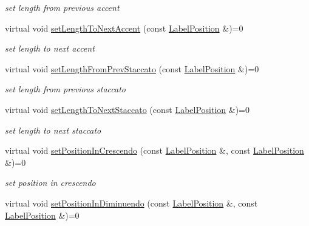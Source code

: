 \begin{DoxyCompactItemize}
\begin{DoxyCompactList}\small\item\em set length from previous accent \end{DoxyCompactList}\item 
\hypertarget{classsinsy_1_1INoteLabel_aeef956ffef5e64d64ed1b6005561755f}{virtual void \hyperlink{classsinsy_1_1INoteLabel_aeef956ffef5e64d64ed1b6005561755f}{set\-Length\-To\-Next\-Accent} (const \hyperlink{classsinsy_1_1LabelPosition}{\-Label\-Position} \&)=0}\label{classsinsy_1_1INoteLabel_aeef956ffef5e64d64ed1b6005561755f}

\begin{DoxyCompactList}\small\item\em set length to next accent \end{DoxyCompactList}\item 
\hypertarget{classsinsy_1_1INoteLabel_a6858fae4cc676d1a54fe6f7b7b7d00c5}{virtual void \hyperlink{classsinsy_1_1INoteLabel_a6858fae4cc676d1a54fe6f7b7b7d00c5}{set\-Length\-From\-Prev\-Staccato} (const \hyperlink{classsinsy_1_1LabelPosition}{\-Label\-Position} \&)=0}\label{classsinsy_1_1INoteLabel_a6858fae4cc676d1a54fe6f7b7b7d00c5}

\begin{DoxyCompactList}\small\item\em set length from previous staccato \end{DoxyCompactList}\item 
\hypertarget{classsinsy_1_1INoteLabel_ac34fd47e368de626f60fb320e229de13}{virtual void \hyperlink{classsinsy_1_1INoteLabel_ac34fd47e368de626f60fb320e229de13}{set\-Length\-To\-Next\-Staccato} (const \hyperlink{classsinsy_1_1LabelPosition}{\-Label\-Position} \&)=0}\label{classsinsy_1_1INoteLabel_ac34fd47e368de626f60fb320e229de13}

\begin{DoxyCompactList}\small\item\em set length to next staccato \end{DoxyCompactList}\item 
\hypertarget{classsinsy_1_1INoteLabel_aac7080ee06a8d7042a1e2aa65130a758}{virtual void \hyperlink{classsinsy_1_1INoteLabel_aac7080ee06a8d7042a1e2aa65130a758}{set\-Position\-In\-Crescendo} (const \hyperlink{classsinsy_1_1LabelPosition}{\-Label\-Position} \&, const \hyperlink{classsinsy_1_1LabelPosition}{\-Label\-Position} \&)=0}\label{classsinsy_1_1INoteLabel_aac7080ee06a8d7042a1e2aa65130a758}

\begin{DoxyCompactList}\small\item\em set position in crescendo \end{DoxyCompactList}\item 
\hypertarget{classsinsy_1_1INoteLabel_ad31fbf650c2d5a146bb0eea67b864694}{virtual void \hyperlink{classsinsy_1_1INoteLabel_ad31fbf650c2d5a146bb0eea67b864694}{set\-Position\-In\-Diminuendo} (const \hyperlink{classsinsy_1_1LabelPosition}{\-Label\-Position} \&, const \hyperlink{classsinsy_1_1LabelPosition}{\-Label\-Position} \&)=0}\label{classsinsy_1_1INoteLabel_ad31fbf650c2d5a146bb0eea67b864694}


\end{DoxyCompactItemize}
